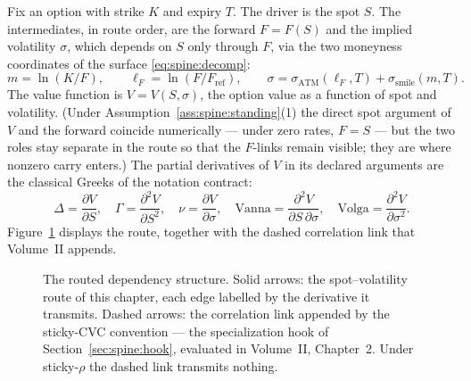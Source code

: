 \documentclass[11pt]{book}
\theoremstyle{plain}
\theoremstyle{definition}
\theoremstyle{remark}
\newcommand{\mln}{m}                             %
\newcommand{\lF}{\ell_F}                         %
\newcommand{\Fref}{F_{\mathrm{ref}}}             %
\newcommand{\ssm}{\sigma_{\mathrm{smile}}}       %
\newcommand{\satm}{\sigma_{\mathrm{ATM}}}        %
\newcommand{\volslope}{\mathrm{vol.slope}}       %
\newcommand{\vega}{\nu}                          %
\newcommand{\Vanna}{\mathrm{Vanna}}
\newcommand{\Volga}{\mathrm{Volga}}
\newcommand{\stickyrho}{\textnormal{sticky-}\ensuremath{\rho}} %
\newcommand{\stickycvc}{\textnormal{sticky-CVC}}               %
\newcommand{\SigmaM}{\Sigma_M}                   %
\newcommand{\dd}{\mathrm{d}}                                  %
\newcommand{\pd}[2]{\frac{\partial #1}{\partial #2}}          %
\newcommand{\pdd}[2]{\frac{\partial^2 #1}{\partial #2^2}}     %
\newcommand{\pdc}[3]{\frac{\partial^2 #1}{\partial #2\,\partial #3}} %
\newcommand{\td}[2]{\frac{\dd #1}{\dd #2}}                    %
\newcommand{\atfixed}[2]{\left.#1\right|_{#2}}                %
\begin{document}
Fix an option with strike $K$ and expiry $T$. The driver is the spot $S$. The
intermediates, in route order, are the forward $F = F(S)$ and the implied
volatility $\sigma$, which depends on $S$ only through $F$, via the two
moneyness coordinates of the surface \eqref{eq:spine:decomp}:
\[
  \mln = \ln(K/F), \qquad \lF = \ln(F/\Fref), \qquad
  \sigma = \satm(\lF, T) + \ssm(\mln, T).
\]
The value function is $V = V(S, \sigma)$, the option value as a function of
spot and volatility. (Under Assumption~\ref{ass:spine:standing}(1) the direct
spot argument of $V$ and the forward coincide numerically --- under zero
rates, $F = S$ --- but the two roles stay separate in the route so that the
$F$-links remain visible; they are where nonzero carry enters.) The
partial derivatives of $V$ in its declared arguments are the classical Greeks
of the notation contract:
\[
  \Delta = \pd{V}{S}, \quad
  \Gamma = \pdd{V}{S}, \quad
  \vega = \pd{V}{\sigma}, \quad
  \Vanna = \pdc{V}{S}{\sigma}, \quad
  \Volga = \pdd{V}{\sigma}.
\]
Figure~\ref{fig:spine:routing} displays the route, together with the dashed
correlation link that Volume~II appends.

\begin{figure}[ht]
\centering
{}
\caption{The routed dependency structure. Solid arrows: the spot--volatility
route of this chapter, each edge labelled by the derivative it transmits.
Dashed arrows: the correlation link appended by the \stickycvc{} convention
--- the specialization hook of Section~\ref{sec:spine:hook}, evaluated in
Volume~II, Chapter~2. Under \stickyrho{} the dashed link transmits nothing.}
\label{fig:spine:routing}
\end{figure}
\end{document}
